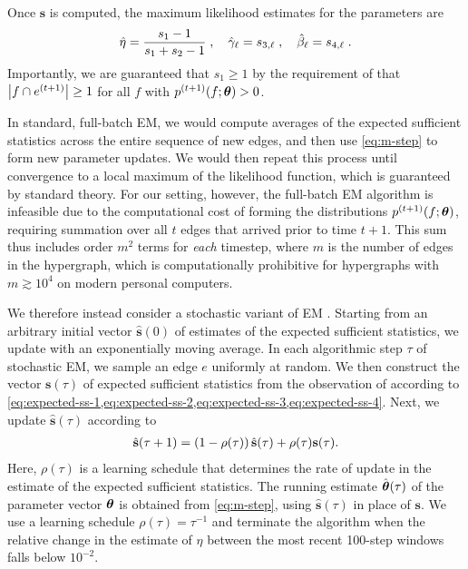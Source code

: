 Once $\mathbf{s}$ is computed, the maximum likelihood estimates for the parameters are 
\begin{align}
    \hat{\eta} = \frac{s_1-1}{s_1 + s_2-1}\;, \quad 
    \hat{\gamma}_\ell = s_{3,\ell}\;, \quad 
    \hat{\beta}_\ell = s_{4,\ell}\;. \label{eq:m-step}
\end{align}
Importantly, we are guaranteed that $s_1\geq 1$  by the requirement of  that $\left\lvert f\cap e^{(t+1)} \right\rvert\geq 1$ for all $f$ with $p^{(t+1)}(f; \boldsymbol{\theta})>0$.

In standard, full-batch EM, we would compute averages of the expected sufficient statistics across the entire sequence of new edges, and then use \cref{eq:m-step} to form new parameter updates. 
We would then repeat this process until convergence to a local maximum of the likelihood function, which is guaranteed by standard theory. 
For our setting, however, the full-batch EM algorithm is infeasible due to the computational cost of forming the distributions $p^{(t+1)}(f; \boldsymbol{\theta})$, 
requiring summation over all $t$ edges that arrived prior to time $t+1$. 
This sum thus includes order $m^2$ terms for \emph{each} timestep, where $m$ is the number of edges in the hypergraph, which  
is computationally prohibitive for hypergraphs with $m\gtrsim 10^4$ on modern personal computers.

We therefore instead consider a stochastic variant of EM \cite{cappeOnLineExpectationMaximization2009}. 
Starting from an arbitrary initial vector $\hat{\mathbf{s}}(0)$ of estimates of the expected sufficient statistics, we update with an exponentially moving average. 
In each algorithmic step $\tau$ of stochastic EM, we sample an edge $e$ uniformly at random. 
We then construct the vector $\mathbf{s}({\tau})$ of expected sufficient statistics from the observation of according to \cref{eq:expected-ss-1,eq:expected-ss-2,eq:expected-ss-3,eq:expected-ss-4}. 
Next, we update $\hat{\mathbf{s}}(\tau)$ according to
\begin{align}
    \hat{\mathbf{s}}(\tau+1) = \left(1-\rho(\tau)\right)\hat{\mathbf{s}}(\tau) + \rho(\tau) \mathbf{s}(\tau). 
\end{align}
Here, $\rho(\tau)$ is a learning schedule that determines the rate of update in the estimate of the expected sufficient statistics.
The running estimate $\hat{\boldsymbol{\theta}}(\tau)$ of the parameter vector $\boldsymbol{\theta}$ is obtained from \cref{eq:m-step}, using $\mathbf{\hat{s}}(\tau)$ in place of $\mathbf{s}$. 
We use a learning schedule $\rho(\tau) = \tau^{-1}$ and terminate the algorithm when the relative change in the estimate of $\eta$ between the most recent 100-step windows falls below $10^{-2}$.






